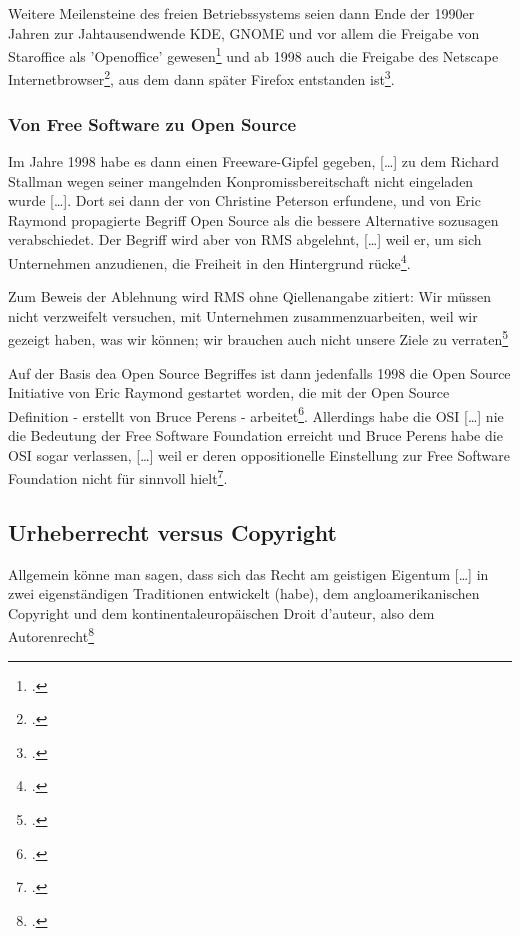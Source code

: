 \documentclass[DIV=calc,BCOR=5mm,11pt,headings=small,oneside,abstract=true, toc=bib]{scrartcl}
\begin{document}
Weitere Meilensteine des freien Betriebssystems seien dann Ende der 1990er
Jahren zur Jahtausendwende KDE, GNOME und vor allem die Freigabe von Staroffice
als 'Openoffice' gewesen\footcite[vgl.][38]{Viesel2006a} und ab 1998 auch die
Freigabe des Netscape Internetbrowser\footcite[vgl.][41]{Viesel2006a}, aus dem
dann später Firefox entstanden ist\footcite[vgl.][41]{Viesel2006a}.


\subsubsection{Von Free Software zu Open Source}

Im Jahre 1998 habe es dann einen \glqq{}Freeware-Gipfel\grqq{} gegeben,
\glqq{}[\ldots] zu dem Richard Stallman wegen seiner mangelnden
Konpromissbereitschaft nicht eingeladen wurde [\ldots]\grqq{}. Dort sei dann der
von \glqq{}Christine Peterson\grqq{} erfundene, und von \glqq{}Eric
Raymond\grqq{} propagierte Begriff \glqq{}Open Source\grqq{} als die bessere
Alternative sozusagen verabschiedet. Der Begriff wird aber von RMS abgelehnt,
\glqq{}[\ldots] weil er, um sich Unternehmen anzudienen, die Freiheit in
den Hintergrund rücke\grqq{}\footcite[vgl.][41]{Viesel2006a}.

Zum Beweis der Ablehnung wird RMS ohne Qiellenangabe zitiert: \glqq{}Wir
müssen nicht verzweifelt versuchen, mit Unternehmen zusammenzuarbeiten,
weil wir gezeigt haben, was wir können; wir brauchen auch nicht unsere
Ziele zu verraten\grqq{}\footcite[vgl.][41]{Viesel2006a}

Auf der Basis dea Open Source Begriffes ist dann jedenfalls 1998 die Open Source
Initiative von Eric Raymond \glqq{}gestartet\grqq{} worden, die mit der Open
Source Definition - erstellt von Bruce Perens -
arbeitet\footcite[vgl.][41]{Viesel2006a}. Allerdings habe die OSI
\glqq{}[\ldots] nie die Bedeutung der Free Software Foundation erreicht\grqq{}
und Bruce Perens habe die OSI sogar verlassen, \glqq{}[\ldots] weil er
deren oppositionelle Einstellung zur Free Software Foundation nicht für
sinnvoll hielt\grqq{}\footcite[vgl.][41]{Viesel2006a}.

\subsection{Urheberrecht versus Copyright}

Allgemein könne man sagen, dass sich \glqq{}das Recht am geistigen
Eigentum [\ldots] in zwei eigenständigen Traditionen entwickelt (habe),
dem angloamerikanischen Copyright und dem kontinentaleuropäischen Droit
d'auteur, also dem Autorenrecht\grqq{}\footcite[vgl.][45]{Viesel2006a}
\end{document}
